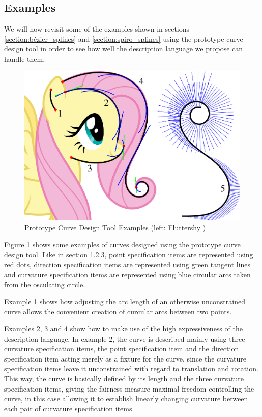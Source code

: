 \documentclass[a4paper]{article}
\begin{document}
		\subsection{Examples}
		\label{section:examples}

			We will now revisit some of the examples shown in sections \ref{section:bézier_splines} and \ref{section:spiro_splines} using the prototype curve design tool in order to see how well the description language we propose can handle them.

			\begin{figure}[htbp]
				\centering
				\includegraphics[width=\textwidth]{content/output/examples_prototype.pdf}
				\caption{Prototype Curve Design Tool Examples (left: Fluttershy \cite{fluttershy})}
				\label{figure:examples_prototype}
			\end{figure}

			Figure \ref{figure:examples_prototype} shows some examples of curves designed using the prototype curve design tool. Like in section 1.2.3, point specification items are represented using red dots, direction specification items are represented using green tangent lines and curvature specification items are represented using blue circular arcs taken from the osculating circle.

			Example 1 shows how adjusting the arc length of an otherwise unconstrained curve allows the convenient creation of curcular arcs between two points.

			Examples 2, 3 and 4 show how to make use of the high expressiveness of the description language. In example 2, the curve is described mainly using three curvature specification items, the point specification item and the direction specification item acting merely as a fixture for the curve, since the curvature specification items leave it unconstrained with regard to translation and rotation. This way, the curve is basically defined by its length and the three curvature specification items, giving the fairness measure maximal freedom controlling the curve, in this case allowing it to establish linearly changing curvature between each pair of curvature specification items.
\end{document}
